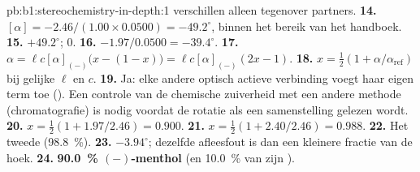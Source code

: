 \begin{solution}{pb:b1:stereochemistry-in-depth:1}
verschillen alleen tegenover  partners.
\textbf{14.} $[\alpha] = -2.46/(1.00 \times 0.0500) = -49.2^\circ$, binnen
het bereik van het handboek.
\textbf{15.} $+49.2^\circ$; $0$.
\textbf{16.} $-1.97/0.0500 = -39.4^\circ$.
\textbf{17.} $\alpha = \ell c[\alpha]_{(-)}\bigl(x - (1 - x)\bigr) =
\ell c[\alpha]_{(-)}(2x - 1)$.
\textbf{18.} $x = \frac12(1 + \alpha/\alpha_{\text{ref}})$ bij gelijke $\ell$ en $c$.
\textbf{19.} Ja: elke andere optisch actieve verbinding voegt haar eigen
term toe (). Een controle van de chemische zuiverheid met een
andere methode (chromatografie) is nodig voordat de rotatie als een
samenstelling gelezen wordt.
\textbf{20.} $x = \frac12(1 + 1.97/2.46) = 0.900$.
\textbf{21.} $x = \frac12(1 + 2.40/2.46) = 0.988$.
\textbf{22.} Het tweede (\qty{98.8}{\percent}).
\textbf{23.} $-3.94^\circ$; dezelfde afleesfout is dan een kleinere
fractie van de hoek.
\textbf{24.} \textbf{\qty{90.0}{\percent} $(-)$-menthol} (en
\qty{10.0}{\percent} van zijn ).
\end{solution}
